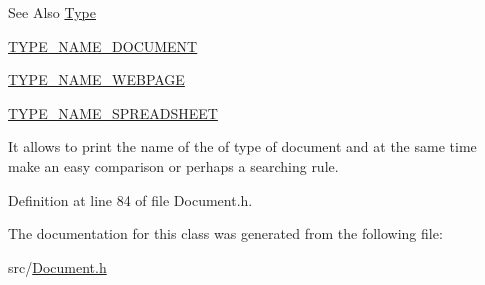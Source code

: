 \begin{DoxySeeAlso}{See Also}
\hyperlink{namespacedocs_a150efca62822b8ab62a5afabe299bf75}{Type} 

\hyperlink{namespacedocs_a88f8e41b03147cf4197261676999d12c}{T\-Y\-P\-E\-\_\-\-N\-A\-M\-E\-\_\-\-D\-O\-C\-U\-M\-E\-N\-T} 

\hyperlink{namespacedocs_ac41cf3635e22c3750deddd000fd4c34b}{T\-Y\-P\-E\-\_\-\-N\-A\-M\-E\-\_\-\-W\-E\-B\-P\-A\-G\-E} 

\hyperlink{namespacedocs_a3f58481f03c01b3da04828585d14ff77}{T\-Y\-P\-E\-\_\-\-N\-A\-M\-E\-\_\-\-S\-P\-R\-E\-A\-D\-S\-H\-E\-E\-T}
\end{DoxySeeAlso}
It allows to print the name of the of type of document and at the same time make an easy comparison or perhaps a searching rule. 

Definition at line 84 of file Document.\-h.



The documentation for this class was generated from the following file\-:\begin{DoxyCompactItemize}
\item 
src/\hyperlink{Document_8h}{Document.\-h}\end{DoxyCompactItemize}
